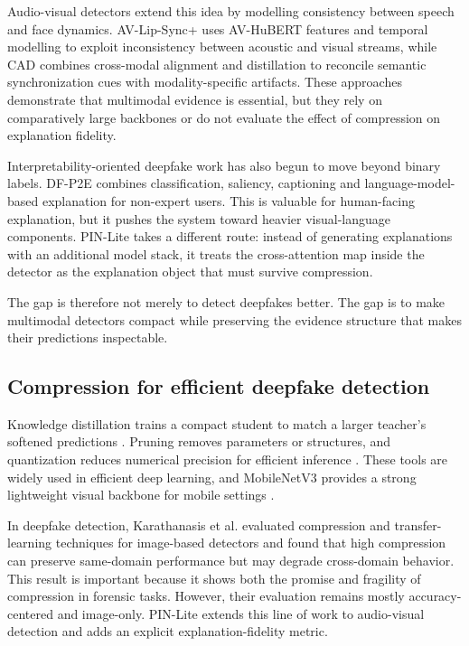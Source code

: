 \documentclass[pdflatex,sn-basic,Numbered]{sn-jnl}
\begin{document}
Audio-visual detectors extend this idea by modelling consistency between speech and face dynamics. AV-Lip-Sync+ \cite{shahzad2023avlipsync} uses AV-HuBERT features and temporal modelling to exploit inconsistency between acoustic and visual streams, while CAD \cite{du2025cad} combines cross-modal alignment and distillation to reconcile semantic synchronization cues with modality-specific artifacts. These approaches demonstrate that multimodal evidence is essential, but they rely on comparatively large backbones or do not evaluate the effect of compression on explanation fidelity.

Interpretability-oriented deepfake work has also begun to move beyond binary labels. DF-P2E \cite{tariq2025dfp2e} combines classification, saliency, captioning and language-model-based explanation for non-expert users. This is valuable for human-facing explanation, but it pushes the system toward heavier visual-language components. PIN-Lite takes a different route: instead of generating explanations with an additional model stack, it treats the cross-attention map inside the detector as the explanation object that must survive compression.

The gap is therefore not merely to detect deepfakes better. The gap is to make multimodal detectors compact while preserving the evidence structure that makes their predictions inspectable.

\subsection{Compression for efficient deepfake detection}\label{subsec:compression}

Knowledge distillation trains a compact student to match a larger teacher's softened predictions \cite{hinton2015distilling}. Pruning removes parameters or structures, and quantization reduces numerical precision for efficient inference \cite{jacob2018quantization}. These tools are widely used in efficient deep learning, and MobileNetV3 provides a strong lightweight visual backbone for mobile settings \cite{howard2019mobilenetv3}.

In deepfake detection, Karathanasis et al. \cite{karathanasis2025compression} evaluated compression and transfer-learning techniques for image-based detectors and found that high compression can preserve same-domain performance but may degrade cross-domain behavior. This result is important because it shows both the promise and fragility of compression in forensic tasks. However, their evaluation remains mostly accuracy-centered and image-only. PIN-Lite extends this line of work to audio-visual detection and adds an explicit explanation-fidelity metric.
\end{document}
